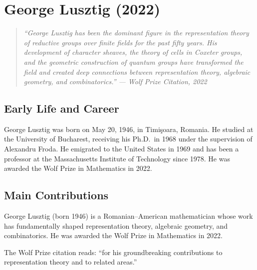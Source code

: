 \providecommand{\Ind}{\operatorname{Ind}}

\chapter{George Lusztig (2022)}

\begin{quote}
\it ``George Lusztig has been the dominant figure in the representation theory of reductive groups over finite fields for the past fifty years. His development of character sheaves, the theory of cells in Coxeter groups, and the geometric construction of quantum groups have transformed the field and created deep connections between representation theory, algebraic geometry, and combinatorics.'' --- Wolf Prize Citation, 2022
\end{quote}

\section{Early Life and Career}

George Lusztig was born on May 20, 1946, in Timi\c{s}oara, Romania. He studied at the University of Bucharest, receiving his Ph.D.\ in 1968 under the supervision of Alexandru Froda. He emigrated to the United States in 1969 and has been a professor at the Massachusetts Institute of Technology since 1978. He was awarded the Wolf Prize in Mathematics in 2022.

\section{Main Contributions}

George Lusztig (born 1946) is a Romanian--American mathematician whose work has fundamentally shaped representation theory, algebraic geometry, and combinatorics. He was awarded the Wolf Prize in Mathematics in 2022.

The Wolf Prize citation reads: ``for his groundbreaking contributions to representation theory and to related areas.''

